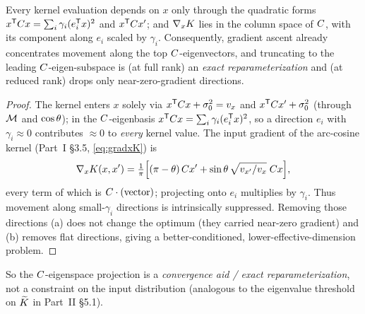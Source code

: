 \begin{proposition}\label{prop:subspace}
Every kernel evaluation depends on $x$ only through the quadratic forms
$x^{\mathsf{T}}C x=\sum_i\gamma_i(e_i^{\mathsf{T}} x)^2$ and $x^{\mathsf{T}}C x'$;
and $\nabla_xK$ lies in the column space of $C$, with its component along
$e_i$ scaled by $\gamma_i$. Consequently, gradient ascent already concentrates
movement along the top $C$-eigenvectors, and truncating to the leading
$C$-eigen-subspace is (at full rank) an \emph{exact reparameterization} and
(at reduced rank) drops only near-zero-gradient directions.
\end{proposition}
\begin{proof}
The kernel enters $x$ solely via $x^{\mathsf{T}}C x+\sigma_{0}^2=v_x$ and
$x^{\mathsf{T}}C x'+\sigma_{0}^2$ (through $\mathcal{M}$ and $\cos\theta$); in the
$C$-eigenbasis $x^{\mathsf{T}}C x=\sum_i\gamma_i(e_i^{\mathsf{T}} x)^2$, so a
direction $e_i$ with $\gamma_i\approx0$ contributes $\approx0$ to \emph{every}
kernel value. The input gradient of the arc-cosine kernel (Part~I \S3.5,
\eqref{eq:gradxK}) is
\[
  \nabla_xK(x,x')=\tfrac1\pi\Bigl[(\pi-\theta)\,C x'+\sin\theta\,\sqrt{v_{x'}/v_x}\;C x\Bigr],
\]
every term of which is $C\cdot(\text{vector})$; projecting onto $e_i$ multiplies
by $\gamma_i$. Thus movement along small-$\gamma_i$ directions is intrinsically
suppressed. Removing those directions (a) does not change the optimum (they carried
near-zero gradient) and (b) removes flat directions, giving a better-conditioned,
lower-effective-dimension problem.
\end{proof}

So the $C$-eigenspace projection is a \emph{convergence aid / exact
reparameterization}, not a constraint on the input distribution (analogous to the
eigenvalue threshold on $\widetilde{K}$ in Part~II \S5.1).

